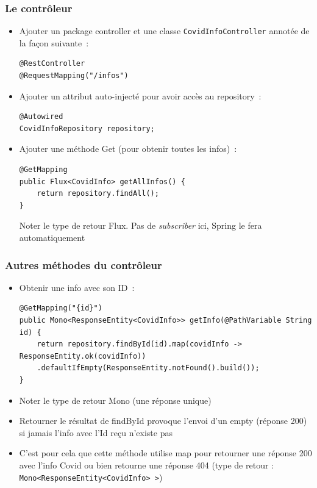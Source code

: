 \documentclass{beamer}
\begin{document}
\begin{frame}[fragile]
	\frametitle{Le contrôleur}
	\begin{itemize}
		\item Ajouter un package controller et une classe \texttt{CovidInfoController} annotée de la façon suivante~:
\begin{lstlisting}
@RestController
@RequestMapping("/infos")
\end{lstlisting}
	\item Ajouter un attribut auto-injecté pour avoir accès au repository~:
\begin{lstlisting}
@Autowired
CovidInfoRepository repository;
\end{lstlisting}
\item Ajouter une méthode Get (pour obtenir toutes les infos)~:
\begin{lstlisting}
@GetMapping
public Flux<CovidInfo> getAllInfos() {
	return repository.findAll();
}
\end{lstlisting}
Noter le type de retour Flux. Pas de \textit{subscriber} ici, Spring le fera automatiquement
	\end{itemize}
\end{frame}

\begin{frame}[fragile]
	\frametitle{Autres méthodes du contrôleur}
	\begin{itemize}
		\item Obtenir une info avec son ID~:
\begin{lstlisting}
@GetMapping("{id}")
public Mono<ResponseEntity<CovidInfo>> getInfo(@PathVariable String id) {
	return repository.findById(id).map(covidInfo -> ResponseEntity.ok(covidInfo))
	.defaultIfEmpty(ResponseEntity.notFound().build());
}
\end{lstlisting}
\item Noter le type de retour Mono (une réponse unique)
\item Retourner le résultat de findById provoque l'envoi d'un empty (réponse 200) si jamais l'info avec l'Id reçu n'existe pas
\item C'est pour cela que cette méthode utilise map pour retourner une réponse 200 avec l'info Covid ou bien retourne une réponse 404 (type de retour : \texttt{Mono<ResponseEntity<CovidInfo>~>})
	\end{itemize}
\end{frame}
\end{document}
